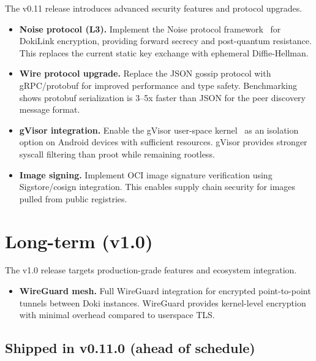 The v0.11 release introduces advanced security features and protocol
upgrades.

\begin{itemize}[leftmargin=*, itemsep=4pt]
  \item \textbf{Noise protocol (L3).} Implement the Noise protocol
        framework~\cite{noise2015} for DokiLink encryption,
        providing forward secrecy and post-quantum resistance. This
        replaces the current static key exchange with ephemeral
        Diffie-Hellman.

  \item \textbf{Wire protocol upgrade.} Replace the JSON gossip
        protocol with gRPC/protobuf for improved performance and
        type safety. Benchmarking shows protobuf serialization is
        3--5x faster than JSON for the peer discovery message format.

  \item \textbf{gVisor integration.} Enable the gVisor user-space
        kernel~\cite{gvisor2024} as an isolation option on
        Android devices with sufficient resources. gVisor provides
        stronger syscall filtering than proot while remaining
        rootless.

  \item \textbf{Image signing.} Implement OCI image signature
        verification using Sigstore/cosign integration. This enables
        supply chain security for images pulled from public registries.
\end{itemize}

\section{Long-term (v1.0)}
\label{sec:roadmap-long}

The v1.0 release targets production-grade features and ecosystem
integration.

\begin{itemize}[leftmargin=*, itemsep=4pt]
  \item \textbf{WireGuard mesh.} Full WireGuard integration for
        encrypted point-to-point tunnels between Doki instances.
        WireGuard provides kernel-level encryption with minimal
        overhead compared to userspace TLS.
\end{itemize}

\subsection*{Shipped in v0.11.0 (ahead of schedule)}


